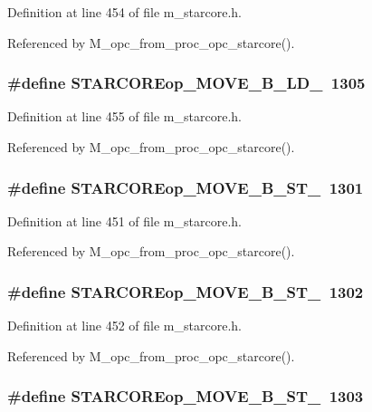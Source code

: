 Definition at line 454 of file m\_\-starcore.h.

Referenced by M\_\-opc\_\-from\_\-proc\_\-opc\_\-starcore().
\subsubsection{\setlength{\rightskip}{0pt plus 5cm}\#define STARCOREop\_\-MOVE\_\-B\_\-LD\_~1305}\label{m__starcore_8h_35ab5d0e9efd87854991c1cf218f9166}




Definition at line 455 of file m\_\-starcore.h.

Referenced by M\_\-opc\_\-from\_\-proc\_\-opc\_\-starcore().
\subsubsection{\setlength{\rightskip}{0pt plus 5cm}\#define STARCOREop\_\-MOVE\_\-B\_\-ST\_~1301}\label{m__starcore_8h_9d013ee6af557405c56af3d96486ac02}




Definition at line 451 of file m\_\-starcore.h.

Referenced by M\_\-opc\_\-from\_\-proc\_\-opc\_\-starcore().
\subsubsection{\setlength{\rightskip}{0pt plus 5cm}\#define STARCOREop\_\-MOVE\_\-B\_\-ST\_~1302}\label{m__starcore_8h_8eed99c3f970b81a4e2c50b513b6e9ae}




Definition at line 452 of file m\_\-starcore.h.

Referenced by M\_\-opc\_\-from\_\-proc\_\-opc\_\-starcore().
\subsubsection{\setlength{\rightskip}{0pt plus 5cm}\#define STARCOREop\_\-MOVE\_\-B\_\-ST\_~1303}\label{m__starcore_8h_44f52fec94ca1934842b103518bf4d1d}




